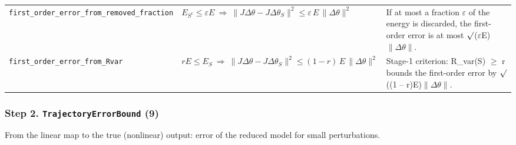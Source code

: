 {\begin{longtable}{@{}>{\raggedright\arraybackslash}p{3.6cm}>{\raggedright\arraybackslash}p{6.6cm}>{\raggedright\arraybackslash}p{5.6cm}@{}}
\texttt{first\_\allowbreak{}order\_\allowbreak{}error\_\allowbreak{}from\_\allowbreak{}removed\_\allowbreak{}fraction} & $\displaystyle E_{S^c}\le\varepsilon E\ \Rightarrow\ \|J\Delta\theta-J\Delta\theta_S\|^2\le\varepsilon\,E\,\|\Delta\theta\|^2$ & If at most a fraction $\varepsilon$ of the energy is discarded, the first-order error is at most $\surd$($\varepsilon$E)$\|\Delta\theta\|$. \\[3pt]
\texttt{first\_\allowbreak{}order\_\allowbreak{}error\_\allowbreak{}from\_\allowbreak{}Rvar} & $\displaystyle rE\le E_S\ \Rightarrow\ \|J\Delta\theta-J\Delta\theta_S\|^2\le(1-r)\,E\,\|\Delta\theta\|^2$ & Stage-1 criterion: R\_var(S) $\ge$ r bounds the first-order error by $\surd$((1 -- r)E)$\|\Delta\theta\|$. \\[3pt]
\bottomrule
\end{longtable}
}

\subsubsection*{Step 2. \texttt{TrajectoryErrorBound} (9)}
From the linear map to the true (nonlinear) output: error of the reduced model for small perturbations.

